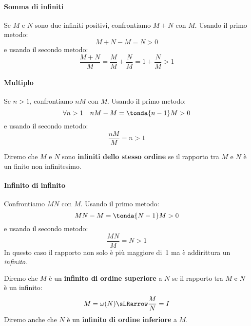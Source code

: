 \paragraph{Somma di infiniti}
Se \(M\) e \(N\) sono due infiniti positivi, confrontiamo \(M+N\) 
con \(M\). 
Usando il primo metodo:
\[M+N-M = N > 0\]
e usando il secondo metodo: 
\[\frac{M+N}{M} =
  \frac{M}{M} + \frac{N}{M} = 
  1 + \frac{N}{M} > 1\]
\paragraph{Multiplo}
Se \(n>1\), confrontiamo \(nM\) con \(M\). 
Usando il primo metodo:
\[\forall n>1 \quad nM-M = \tonda{n-1}M > 0\]
e usando il secondo metodo: 
\[\frac{nM}{M} = n > 1\]
\begin{definizione}
 Diremo che \(M\) e \(N\) sono \textbf{infiniti dello stesso ordine}  
se il rapporto tra \(M\) e \(N\) è un finito non infinitesimo.
\end{definizione}
\paragraph{Infinito di infinito}
Confrontiamo \(MN\) con \(M\). 
Usando il primo metodo:
\[MN-M = \tonda{N-1}M > 0\]
e usando il secondo metodo: 
\[\frac{MN}{M} = N > 1\]
In questo caso il rapporto non solo è più maggiore di~1 ma è addirittura un 
\emph{infinito}. 
\begin{definizione}
 Diremo che \(M\) è un \textbf{infinito di ordine superiore} a 
\(N\) se il rapporto tra \(M\) e \(N\) è un infinito:
\[M=\omega(N) \sLRarrow \frac{M}{N}=I\]
Diremo anche che 
\(N\) è un \textbf{infinito di ordine inferiore} a \(M\).
\end{definizione}
% 
% 

